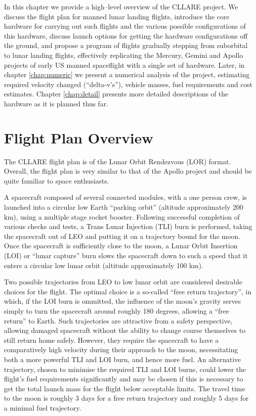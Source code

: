 \documentclass{report}
\begin{document}
In this chapter we provide a high--level overview of the CLLARE project.  We discuss the flight plan for manned lunar landing flights, introduce the core hardware for carrying out such flights and the various possible configurations of this hardware, discuss launch options for getting the hardware configurations off the ground, and propose a program of flights gradually stepping from suborbital to lunar landing flights, effectively replicating the Mercury, Gemini and Apollo projects of early US manned spaceflight with a single set of hardware.  Later, in chapter \ref{chap:numeric} we present a numerical analysis of the project, estimating required velocity changed (``delta-v's''), vehicle masses, fuel requirements and cost estimates.  Chapter \ref{chap:detail} presents more detailed descriptions of the hardware as it is planned thus far.

\section{Flight Plan Overview} \label{sec:flightplan}

The CLLARE flight plan is of the Lunar Orbit Rendezvous (LOR) format.  Overall, the flight plan is very similar to that of the Apollo project and should be quite familiar to space enthusiasts.

A spacecraft composed of several connected modules, with a one person crew, is launched into a circular low Earth ``parking orbit'' (altitude approximately 200 km), using a multiple stage rocket booster.  Following successful completion of various checks and tests, a Trans Lunar Injection (TLI) burn is performed, taking the spacecraft out of LEO and putting it on a trajectory bound for the moon.  Once the spacecraft is sufficiently close to the moon, a Lunar Orbit Insertion (LOI) or ``lunar capture'' burn slows the spacecraft down to such a speed that it enters a circular low lunar orbit (altitude approximately 100 km).

Two possible trajectories from LEO to low lunar orbit are considered desirable choices for the flight.  The optimal choice is a so-called ``free return trajectory'', in which, if the LOI burn is ommitted, the influence of the moon's gravity serves simply to turn the spacecraft around roughly 180 degrees, allowing a ``free return'' to Earth.  Such trajectories are attractive from a safety perspective, allowing damaged spacecraft without the ability to change course themselves to still return home safely.  However, they require the spacecraft to have a comparatively high velocity during their approach to the moon, necessitating both a more powerful TLI and LOI burn, and hence more fuel.  An alternative trajectory, chosen to minimise the required TLI and LOI burns, could lower the flight's fuel requirements significantly and may be chosen if this is necessary to get the total launch mass for the flight below acceptable limits.  The travel time to the moon is roughly 3 days for a free return trajectory and roughly 5 days for a minimal fuel trajectory.
\end{document}
